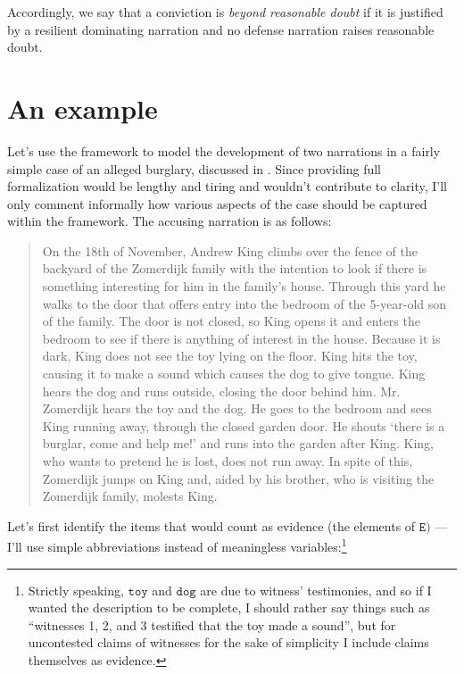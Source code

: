 \documentclass[10pt,leqno]{article}
\begin{document}
  
  
Accordingly,  we say that a conviction is \emph{beyond reasonable doubt} if it is justified by a resilient dominating narration and no defense narration raises reasonable doubt.


\section{An example}\label{sec:an_example}


Let's use the framework to model the development of two narrations in a fairly simple case of an alleged burglary, discussed in \citep{bex2007sense}.
Since providing full formalization would be lengthy and tiring and wouldn't contribute to clarity, I'll only comment informally how various aspects of the case should be captured within the framework.
 The accusing narration is as follows:

\begin{quote}
On the 18th of November, Andrew King climbs over the fence of the backyard of the Zomerdijk family with the intention to look if there is something interesting for him in the family's house. Through this yard he walks to the door that offers entry into the bedroom of the 5-year-old son of the family. The door is not closed, so King opens it and enters the bedroom to see if there is anything of interest in the house. Because it is dark, King does not see the toy lying on the  floor. King hits the toy, causing it to make a sound which causes the dog to give tongue. King hears the dog and runs outside, closing the door behind him. Mr. Zomerdijk hears the toy and the dog. He goes to the bedroom and sees King running away, through the closed garden door. He shouts ‘there is a burglar, come and help me!’ and runs into the garden after King. King, who wants to pretend he is lost, does not run away. In spite of this, Zomerdijk jumps on King and, aided by his brother, who is visiting the Zomerdijk family, molests King.
\end{quote}

Let's first identify the items that would count as evidence (the elements of $\mathtt{E})$ --- I'll use simple abbreviations instead of meaningless variables:\footnote{Strictly speaking, $\mathtt{toy}$ and $\mathtt{dog}$ are due to witness' testimonies, and so if I wanted the description to be complete, I should rather say things such as ``witnesses 1, 2,  and 3 testified that the toy made a sound'', but for uncontested claims of witnesses for the sake of simplicity I include claims themselves as evidence.}
\end{document}
